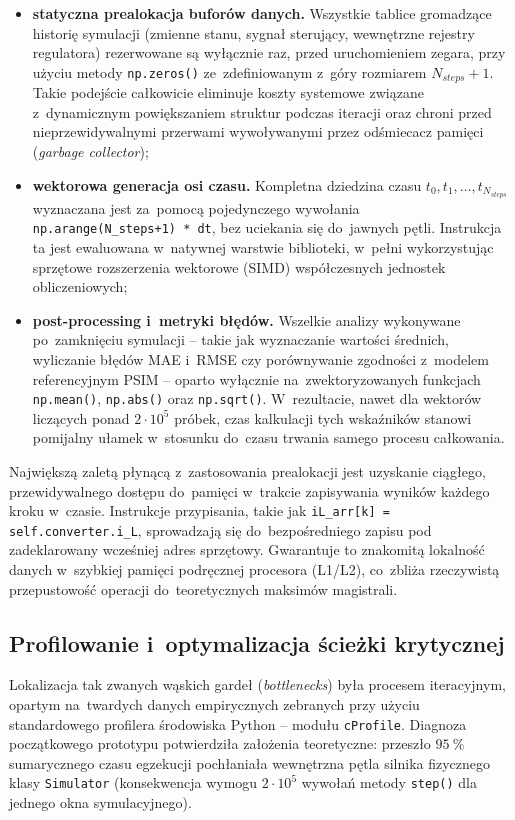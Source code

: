 \begin{itemize}
    \item \textbf{statyczna prealokacja buforów danych.} Wszystkie tablice gromadzące historię symulacji (zmienne stanu, sygnał sterujący, wewnętrzne rejestry regulatora) rezerwowane są wyłącznie raz, przed uruchomieniem zegara, przy użyciu metody \texttt{np.zeros()} ze~zdefiniowanym z~góry rozmiarem $N_{steps}+1$. Takie podejście całkowicie eliminuje koszty systemowe związane z~dynamicznym powiększaniem struktur podczas iteracji oraz chroni przed nieprzewidywalnymi przerwami wywoływanymi przez odśmiecacz pamięci (\emph{garbage collector});
    \item \textbf{wektorowa generacja osi czasu.} Kompletna dziedzina czasu $t_0,t_1,\ldots,t_{N_{steps}}$ wyznaczana jest za~pomocą pojedynczego wywołania \texttt{np.arange(N\_steps+1)\,*\,dt}, bez uciekania się do~jawnych pętli. Instrukcja ta jest ewaluowana w~natywnej warstwie biblioteki, w~pełni wykorzystując sprzętowe rozszerzenia wektorowe (SIMD) współczesnych jednostek obliczeniowych;
    \item \textbf{post-processing i~metryki błędów.} Wszelkie analizy wykonywane po~zamknięciu symulacji -- takie jak wyznaczanie wartości średnich, wyliczanie błędów MAE i~RMSE czy porównywanie zgodności z~modelem referencyjnym PSIM -- oparto wyłącznie na~zwektoryzowanych funkcjach \texttt{np.mean()}, \texttt{np.abs()} oraz \texttt{np.sqrt()}. W~rezultacie, nawet dla wektorów liczących ponad $2\cdot 10^5$ próbek, czas kalkulacji tych wskaźników stanowi pomijalny ułamek w~stosunku do~czasu trwania samego procesu całkowania.
\end{itemize}

Największą zaletą płynącą z~zastosowania prealokacji jest uzyskanie ciągłego, przewidywalnego dostępu do~pamięci w~trakcie zapisywania wyników każdego kroku w~czasie. Instrukcje przypisania, takie jak \texttt{iL\_arr[k] = self.converter.i\_L}, sprowadzają się do~bezpośredniego zapisu pod zadeklarowany wcześniej adres sprzętowy. Gwarantuje to znakomitą lokalność danych w~szybkiej pamięci podręcznej procesora (L1/L2), co~zbliża rzeczywistą przepustowość operacji do~teoretycznych maksimów magistrali.

\subsection{Profilowanie i~optymalizacja ścieżki krytycznej}
\label{subsec:profiling}

Lokalizacja tak zwanych wąskich gardeł (\emph{bottlenecks}) była procesem iteracyjnym, opartym na~twardych danych empirycznych zebranych przy użyciu standardowego profilera środowiska Python -- modułu \texttt{cProfile}. Diagnoza początkowego prototypu potwierdziła założenia teoretyczne: przeszło $95~\%$ sumarycznego czasu egzekucji pochłaniała wewnętrzna pętla silnika fizycznego klasy \texttt{Simulator} (konsekwencja wymogu $2\cdot 10^5$ wywołań metody \texttt{step()} dla jednego okna symulacyjnego).

